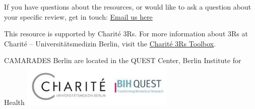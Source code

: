 \documentclass[
]{book}
\begin{document}
If you have questions about the resources, or would like to ask a question about your specific review, get in touch: \href{mailto:CAMARADES.berlin@charite.de}{Email us here}

This resource is supported by Charité 3Rs. For more information about 3Rs at Charité -- Universitätsmedizin Berlin, visit the \href{https://charite3r.charite.de/en/charite_3r_toolbox/}{Charité 3Rs Toolbox}.

CAMARADES Berlin are located in the QUEST Center, Berlin Institute for Health
\includegraphics[width=0.55\textwidth,height=\textheight]{charite-BIHquest.jpg}

  
\end{document}

